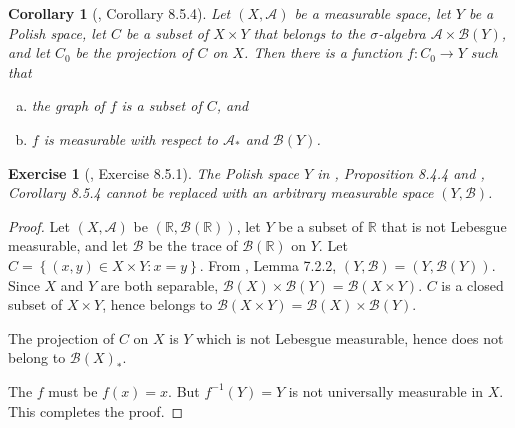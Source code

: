 \documentclass[11pt]{article}
\theoremstyle{plain}
\newtheorem{exercise}{Exercise}
\newtheorem{corollary}{Corollary}
\theoremstyle{definition}
\theoremstyle{remark}
\begin{document}
\begin{corollary}[\cite{book:992991}, Corollary 8.5.4]
    Let $(X, \mathscr A)$ be a measurable space, let $Y$ be a Polish space, let $C$ be a subset of $X \times Y$ that belongs to the $\sigma$-algebra $\mathscr A \times \mathscr B (Y)$, and let $C_0$ be the projection of $C$ on $X$.
    Then there is a function $f: C_0 \to Y$ such that
    \begin{enumerate}[(a)]
        \item 
            the graph of $f$ is a subset of $C$, and
        \item
            $f$ is measurable with respect to $\mathscr A_*$ and $\mathscr B (Y)$.
    \end{enumerate}
\end{corollary}

\begin{exercise}[\cite{book:992991}, Exercise 8.5.1]
    The Polish space $Y$ in \cite{book:992991}, Proposition 8.4.4 and \cite{book:992991}, Corollary 8.5.4 cannot be replaced with an arbitrary measurable space $(Y, \mathscr B)$.
\end{exercise}

\begin{proof}
    Let $(X, \mathscr A)$ be $(\mathbb R, \mathscr B (\mathbb R))$, let $Y$ be a subset of $\mathbb R$ that is not Lebesgue measurable, and let $\mathscr B$ be the trace of $\mathscr B (\mathbb R)$ on $Y$.
    Let $C= \left\{ (x,y) \in X\times Y: x=y \right\}$.
    From \cite{book:992991}, Lemma 7.2.2, $(Y, \mathscr B)= (Y, \mathscr B (Y))$.
    Since $X$ and $Y$ are both separable, $\mathscr B(X) \times \mathscr B (Y) = \mathscr B (X\times Y)$.
    $C$ is a closed subset of $X\times Y$, hence belongs to $\mathscr B (X\times Y)=\mathscr B(X) \times \mathscr B (Y) $.
    
    The projection of $C$ on $X$ is $Y$ which is not Lebesgue measurable, hence does not belong to $\mathscr B (X)_*$.

    The $f$ must be $f(x) = x$. But $f^{-1}(Y) = Y$ is not universally measurable in $X$. 
    This completes the proof.
    
\end{proof}
\end{document}
